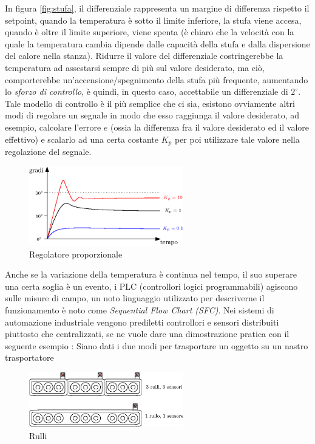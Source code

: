\documentclass[10pt, letterpaper]{report}
\begin{document}
In figura \ref{fig:stufa}, il differenziale rappresenta un margine 
di differenza rispetto il setpoint, quando la temperatura è 
sotto il limite inferiore, la stufa viene accesa, quando è oltre il limite 
superiore, viene spenta (è chiaro che la velocità con la quale la temperatura 
cambia dipende dalle capacità della stufa e dalla dispersione del calore nella stanza).\acc 
Ridurre il valore del differenziale costringerebbe la temperatura ad assestarsi 
sempre di più sul valore desiderato, ma ciò, comporterebbe un'accensione/spegnimento della 
stufa più frequente, aumentando lo \textit{sforzo di controllo}, è quindi, in questo 
caso, accettabile un differenziale di $2^\circ$.\acc 
Tale modello di controllo è il più semplice che ci sia, esistono ovviamente altri modi di regolare un 
segnale in modo che esso raggiunga il valore desiderato, ad esempio, calcolare l'errore $e$ (ossia la differenza 
fra il valore desiderato ed il valore effettivo) e scalarlo ad una certa costante $K_p$ per poi utilizzare tale 
valore nella regolazione del segnale.
\begin{center}
    \begin{figure}[h!]
        \centering
        \includegraphics[width=0.6\textwidth ]{images/stufaEsempioPROP.eps}
        \caption{Regolatore proporzionale}
        \label{fig:regPropStuda}
   \end{figure} 
\end{center}
Anche se la variazione della temperatura è continua nel tempo, il suo 
superare una certa soglia è un evento, i PLC (controllori logici programmabili) 
agiscono sulle misure di campo, un noto linguaggio utilizzato per descriverne 
il funzionamento è noto come \textit{Sequential Flow Chart (SFC)}.\acc 
Nei sistemi di automazione industriale vengono prediletti controllori e sensori distribuiti piuttosto 
che centralizzati, se ne vuole dare una dimostrazione pratica con il seguente 
esempio : Siano dati i due modi per trasportare un oggetto 
su un nastro trasportatore\begin{center}
    \begin{figure}[h!]
        \centering
        \includegraphics[width=0.6\textwidth ]{images/rulli.eps}
        \caption{Rulli}
        \label{fig:rulli}
   \end{figure} 
\end{center}
\end{document}

